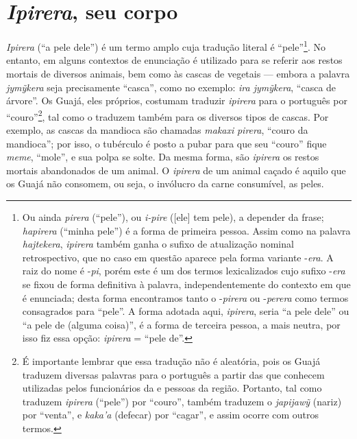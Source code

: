 \section{\emph{Ipirera}, seu
corpo}\label{ipirera-seu-corpo}

\emph{Ipirera} (``a pele dele'') é um termo amplo cuja tradução literal é
``pele''\footnote{Ou ainda \emph{pirera} (``pele''), ou \emph{i-pire}
  ({[}ele{]} tem pele), a depender da frase; \emph{hapirera} (``minha
      pele'') é a forma de primeira pessoa. Assim como na palavra
  \emph{hajtekera}, \emph{ipirera} também ganha o sufixo de atualização
  nominal retrospectivo, que no caso em questão aparece pela forma
  variante -\emph{era}. A raiz do nome é -\emph{pi}, porém este é um dos
  termos lexicalizados cujo sufixo -\emph{era} se fixou de forma
  definitiva à palavra, independentemente do contexto em que é
  enunciada; desta forma encontramos tanto o -\emph{pirera} ou
  -\emph{perera} como termos consagrados para ``pele''. A forma adotada
  aqui, \emph{ipirera}, seria ``a pele dele'' ou ``a pele de (alguma
      coisa)'', é a forma de terceira pessoa, a mais neutra, por isso fiz
  essa opção: \emph{ipirera} = ``pele de''.}. No entanto, em alguns
contextos de enunciação é utilizado para se referir aos restos mortais
de diversos animais, bem como às cascas de vegetais --- embora a palavra
\emph{jymỹkera} seja precisamente ``casca'', como no exemplo: \emph{ira
jymỹkera}, ``casca de árvore''. Os Guajá, eles próprios, costumam traduzir
\emph{ipirera} para o português por ``couro''\footnote{É importante
  lembrar que essa tradução não é aleatória, pois os Guajá traduzem
  diversas palavras para o português a partir das que conhecem
  utilizadas pelos funcionários da  e pessoas da região. Portanto,
  tal como traduzem \emph{ipirera} (``pele'') por ``couro'', também traduzem
  o \emph{japijawỹ} (nariz) por ``venta'', e \emph{kaka'a} (defecar) por
  ``cagar'', e assim ocorre com outros termos.}, tal como o traduzem
também para os diversos tipos de cascas. Por exemplo, as cascas da
mandioca são chamadas \emph{makaxi} \emph{pirera}, ``couro da mandioca'';
por isso, o tubérculo é posto a pubar para que seu ``couro'' fique
\emph{meme}, ``mole'', e sua polpa se solte. Da mesma forma, são
\emph{ipirera} os restos mortais abandonados de um animal. O
\emph{ipirera} de um animal caçado é aquilo que os Guajá não consomem,
ou seja, o invólucro da carne consumível, as peles.

